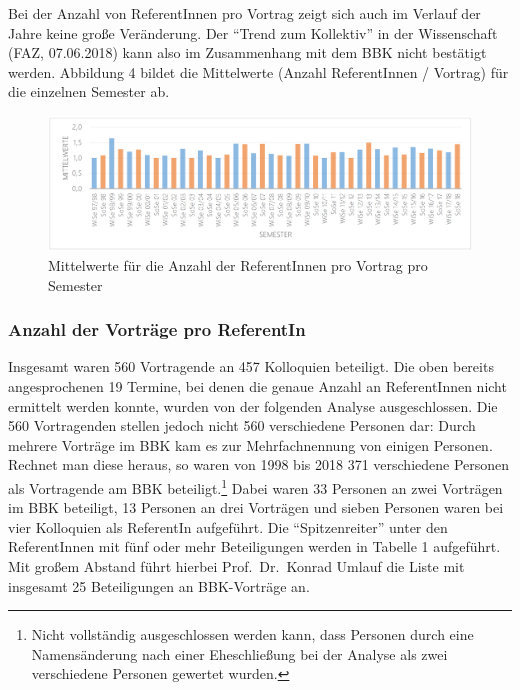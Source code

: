 \documentclass[a4paper,
fontsize=11pt,
oneside,
numbers=noperiodatend,
parskip=half-,
bibliography=totoc,
final
]{scrartcl}
\begin{document}
Bei der Anzahl von ReferentInnen pro Vortrag zeigt sich auch im Verlauf
der Jahre keine große Veränderung. Der \enquote{Trend zum Kollektiv} in
der Wissenschaft (FAZ, 07.06.2018) kann also im Zusammenhang mit dem BBK
nicht bestätigt werden. Abbildung 4 bildet die Mittelwerte (Anzahl
ReferentInnen / Vortrag) für die einzelnen Semester ab.

\begin{figure}[h!]
\centering
\includegraphics[width=16cm]{img/Abbildung4.png}
\caption{Mittelwerte für die Anzahl der ReferentInnen pro Vortrag pro
Semester}
\end{figure}

\hypertarget{anzahl-der-vortruxe4ge-pro-referentin}{%
\subsubsection{Anzahl der Vorträge pro
ReferentIn}\label{anzahl-der-vortruxe4ge-pro-referentin}}

Insgesamt waren 560 Vortragende an 457 Kolloquien beteiligt. Die oben
bereits angesprochenen 19 Termine, bei denen die genaue Anzahl an
ReferentInnen nicht ermittelt werden konnte, wurden von der folgenden
Analyse ausgeschlossen. Die 560 Vortragenden stellen jedoch nicht 560
verschiedene Personen dar: Durch mehrere Vorträge im BBK kam es zur
Mehrfachnennung von einigen Personen. Rechnet man diese heraus, so waren
von 1998 bis 2018 371 verschiedene Personen als Vortragende am BBK
beteiligt.\footnote{Nicht vollständig ausgeschlossen werden kann, dass
  Personen durch eine Namensänderung nach einer Eheschließung bei der
  Analyse als zwei verschiedene Personen gewertet wurden.} Dabei waren
33 Personen an zwei Vorträgen im BBK beteiligt, 13 Personen an drei
Vorträgen und sieben Personen waren bei vier Kolloquien als ReferentIn
aufgeführt. Die \enquote{Spitzenreiter} unter den ReferentInnen mit fünf
oder mehr Beteiligungen werden in Tabelle 1 aufgeführt. Mit großem
Abstand führt hierbei Prof.~Dr.~Konrad Umlauf die Liste mit insgesamt 25
Beteiligungen an BBK-Vorträge an.

\pagebreak
\end{document}

